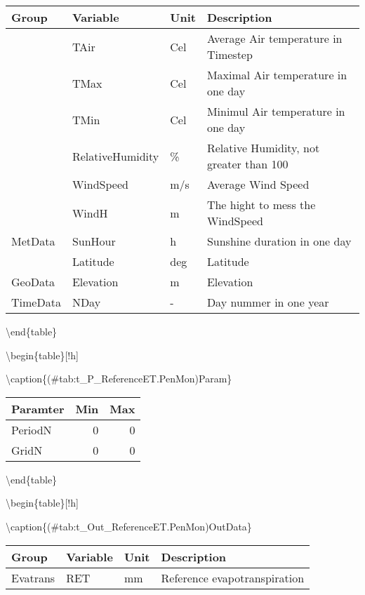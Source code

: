 \documentclass[
]{book}
\begin{document}
\begin{tabular}[t]{l|l|l|l}
\hline
Group & Variable & Unit & Description\\
\hline
 & TAir & Cel & Average Air temperature in Timestep\\
\cline{2-4}
 & TMax & Cel & Maximal Air temperature in one day\\
\cline{2-4}
 & TMin & Cel & Minimul Air temperature in one day\\
\cline{2-4}
 & RelativeHumidity & \% & Relative Humidity, not greater than 100\\
\cline{2-4}
 & WindSpeed & m/s & Average Wind Speed\\
\cline{2-4}
 & WindH & m & The hight to mess the WindSpeed\\
\cline{2-4}
\multirow{-7}{*}{\raggedright\arraybackslash MetData} & SunHour & h & Sunshine duration in one day\\
\cline{1-4}
 & Latitude & deg & Latitude\\
\cline{2-4}
\multirow{-2}{*}{\raggedright\arraybackslash GeoData} & Elevation & m & Elevation\\
\cline{1-4}
TimeData & NDay & - & Day nummer in one year\\
\hline
\end{tabular}

\textbackslash end\{table\}

\textbackslash begin\{table\}{[}!h{]}

\textbackslash caption\{(\#tab:t\_P\_ReferenceET.PenMon)Param\}
\centering

\begin{tabular}[t]{l|r|r}
\hline
Paramter & Min & Max\\
\hline
PeriodN & 0 & 0\\
\cline{1-3}
GridN & 0 & 0\\
\hline
\end{tabular}

\textbackslash end\{table\}

\textbackslash begin\{table\}{[}!h{]}

\textbackslash caption\{(\#tab:t\_Out\_ReferenceET.PenMon)OutData\}
\centering

\begin{tabular}[t]{l|l|l|l}
\hline
Group & Variable & Unit & Description\\
\hline
Evatrans & RET & mm & Reference evapotranspiration\\
\hline
\end{tabular}
\end{document}
